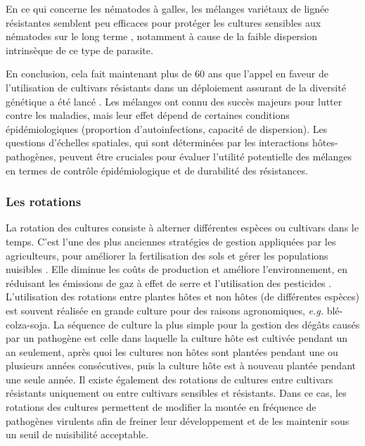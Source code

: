 En ce qui concerne les nématodes à galles, les mélanges variétaux de lignée résistantes  semblent peu efficaces pour protéger les cultures sensibles aux nématodes sur le long terme  \citep{Djian-Caporalino2014}, notamment  à cause de la faible dispersion intrinsèque de ce type de parasite. 

	En conclusion,  cela fait maintenant plus de 60 ans que l'appel en faveur de l'utilisation de cultivars résistants dans un déploiement assurant de la diversité génétique a été lancé \citep{Jensen1952}. Les mélanges ont connu des succès majeurs pour lutter contre les maladies, mais leur effet dépend de certaines conditions épidémiologiques (proportion d'autoinfections, capacité de dispersion).  Les questions d'échelles spatiales, qui sont déterminées par les interactions hôtes-pathogènes, peuvent  être cruciales pour évaluer l'utilité potentielle des mélanges en termes de  contrôle épidémiologique et de durabilité des résistances.



\subsubsection{Les rotations}

	La rotation des cultures consiste à alterner différentes espèces ou cultivars dans le temps. C'est l'une des plus anciennes stratégies de gestion appliquées par les agriculteurs, pour améliorer  la fertilisation des sols et gérer les populations nuisibles \citep{Bullock1992,Bruns2012}. Elle diminue les coûts de production et améliore l'environnement, en réduisant les émissions de gaz à effet de serre et l'utilisation des pesticides \citep{Kleijn2019,Bargues-Ribera2020}.
L'utilisation des rotations entre plantes hôtes et non hôtes (de différentes espèces) est souvent réalisée en grande culture pour des raisons agronomiques, \textit{e.g.} blé-colza-soja. 
La séquence de culture la plus simple pour la gestion des dégâts causés par un pathogène  est celle dans laquelle la culture hôte est cultivée pendant un an  seulement, après quoi les cultures non hôtes sont plantées pendant une ou plusieurs années consécutives, puis la culture hôte est à nouveau plantée pendant une seule année. 
Il existe également des rotations de cultures entre cultivars résistants uniquement ou entre cultivars sensibles et résistants. Dans ce cas, les rotations des cultures permettent de modifier la montée en fréquence de pathogènes virulents afin
de freiner leur développement et de les maintenir sous un seuil de nuisibilité acceptable. 
	
